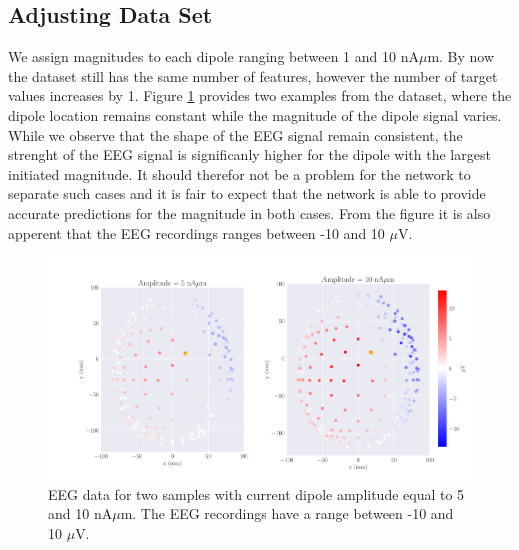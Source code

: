 \documentclass[a4paper, UKenglish, 11pt]{uiomaster}
\begin{document}

\subsection{Adjusting Data Set}
We assign magnitudes to each dipole ranging between 1 and 10 nA$\mu$m. By now the dataset still has the same number of features, however the number of target values increases by 1. Figure \ref{fig:dipole_w_amplitude_example} provides two examples from the dataset, where the dipole location remains constant while the magnitude of the dipole signal varies. While we observe that the shape of the EEG signal remain consistent, the strenght of the EEG signal is significanly higher for the dipole with the largest initiated magnitude. It should therefor not be a problem for the network to separate such cases and it is fair to expect that the network is able to provide accurate predictions for the magnitude in both cases. From the figure it is also apperent that the EEG recordings ranges between -10 and 10 $\mu$V. 

\begin{figure}[!htb]
    \centering
    \includegraphics[width=\linewidth]{figures/dipole_w_amplitude_example.pdf}
    \caption{EEG data for two samples with current dipole amplitude equal to 5 and 10 nA$\mu$m. The EEG recordings have a range between -10 and 10 $\mu$V.}
    \label{fig:dipole_w_amplitude_example}
\end{figure}
\end{document}
